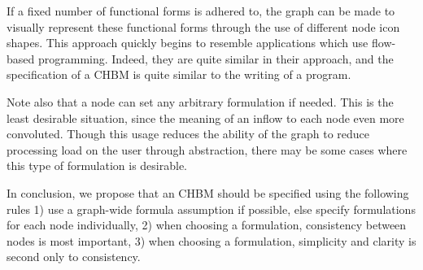 \documentclass[runningheads,a4paper]{llncs}
\begin{document}
If a fixed number of functional forms is adhered to, the graph can be made to visually represent these functional forms through the use of different node icon shapes. 
This approach quickly begins to resemble applications which use flow-based programming. 
Indeed, they are quite similar in their approach, and the specification of a CHBM is quite similar to the writing of a program.

Note also that a node can set any arbitrary formulation if needed. 
This is the least desirable situation, since the meaning of an inflow to each node even more convoluted. 
Though this usage reduces the ability of the graph to reduce processing load on the user through abstraction, there may be some cases where this type of formulation is desirable. 

In conclusion, we propose that an CHBM should be specified using the following rules 1) use a graph-wide formula assumption if possible, else specify formulations for each node individually, 2) when choosing a formulation, consistency between nodes is most important, 3) when choosing a formulation, simplicity and clarity is second only to consistency.
  

\end{document}
